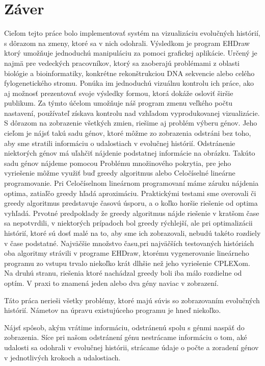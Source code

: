 \chapter*{Záver}

Cieľom tejto práce bolo implementovať systém na vizualizáciu evolučných histórií, s dôrazom na zmeny, ktoré sa v nich odohrali.
Výsledkom je program EHDraw ktorý umožňuje jednoduchú manipuláciu za pomoci grafickej aplikácie.
Určený je najmä pre vedeckých pracovníkov, ktorý sa zaoberajú problémami z oblasti biológie a bioinformatiky,
konkrétne rekonštrukciou DNA sekvencie alebo celého fylogenetického stromu. 
Ponúka im jednoduchú vizuálnu kontrolu ich práce, ako aj možnosť prezentovať svoje výsledky formou, ktorá dokáže osloviť širšie publikum.
Za týmto účelom umožňuje náš program zmenu veľkého počtu nastavení, používateľ získava kontrolu nad vzhľadom vyprodukovanej vizualizácie.
S dôrazom na zobrazenie všetkých zmien, riešime aj problém výberu génov. Jeho cieľom je nájsť takú sadu génov,
ktoré môžme zo zobrazenia odstráni bez toho, aby sme stratili informáciu o udalostiach v evolučnej histórií.
Odstránenie niektorých génov má uľahčiť nájdenie podstatnej informácie na obrázku.
Takúto sadu génov nájdeme pomocou Problému množinového pokrytia, 
pre jeho vyriešenie môžme využiť buď greedy algoritmus alebo Celočíselné lineárne programovanie.
Pri Celočíselnom lineárnom programovaní máme záruku nájdenia optima, zatiaľčo greedy hľadá aproximáciu.
Praktickými testami sme overovali či greedy algoritmus predstavuje časovú úsporu, a o koľko horšie riešenie od optima vyhľadá.
Prvotné predpoklady že greedy algoritmus nájde riešenie v kratšom čase sa nepotvrdili, v niektorých prípadoch bol greedy rýchlejší,
ale pri optimalizácii histórií, ktoré sú dosť malé na to, aby sme ich zobrazovali, nebudú takéto rozdiely v čase podstatné.
Najväčšie množstvo času,pri najväčších testovaných históriách oba algoritmy strávili v programe EHDraw, ktorému vygenerovanie lineárneho programu 
zo vstupu trvalo niekoľko krát dlhšie než jeho vyriešenie CPLEXom.
Na druhú stranu, riešenia ktoré nachádzal greedy boli iba málo rozdielne od optím. V praxi to znamená jeden alebo dva gény naviac v zobrazení.

Táto práca nerieši všetky problémy, ktoré majú súvis so zobrazovaním evolučných histórií. Námetov na úpravu existujúceho programu je hneď niekoľko.

Nájsť spôsob, akým vrátime informáciu, odstránenú spolu s génmi naspäť do zobrazenia. Síce pri našom odstránení génu nestrácame informáciu o tom, 
aké udalosti sa odohrali v evolučnej histórii, strácame údaje o počte a zoradení génov v jednotlivých krokoch a udalostiach.

